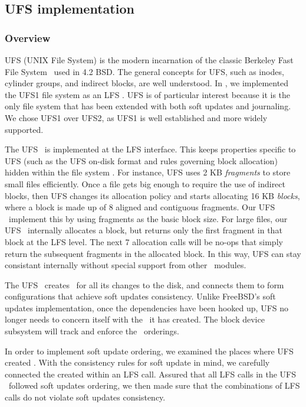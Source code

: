 \subsection{UFS implementation}
\label{sec:modules:ufs}

\subsubsection {Overview}
UFS (UNIX File System) is the modern incarnation of the classic Berkeley Fast
File System~\cite{mckusick84fast} used in 4.2 BSD. The general concepts for
UFS, such as inodes, cylinder groups, and indirect blocks, are well understood.
In \Kudos, we implemented the UFS1 file system as an LFS \module. UFS is of
particular interest because it is the only file system that has been extended
with both soft updates and journaling. ~\cite{seltzer00journaling} We chose
UFS1 over UFS2, as UFS1 is well established and more widely supported.

The UFS \module\ is implemented at the LFS interface. This keeps properties
specific to UFS (such as the UFS on-disk format and rules governing block
allocation) hidden within the file system \module. For instance, UFS uses
2 KB \emph{fragments} to store small files efficiently. Once a file gets big
enough to require the use of indirect blocks, then UFS changes its allocation
policy and starts allocating 16 KB \emph{blocks}, where a block is made up of 8
aligned and contiguous fragments. Our UFS \module\ implement this by using
fragments as the basic block size. For large files, our UFS \module\ internally
allocates a block, but returns only the first fragment in that block at the LFS
level. The next 7 allocation calls will be no-ops that simply return the
subsequent fragments in the allocated block. In this way, UFS can stay
consistant internally without special support from other \Kudos\ modules.

The UFS \module\ creates \chdescs\ for all its changes to the disk, and
connects them to form configurations that achieve soft updates consistency.
Unlike FreeBSD's soft updates implementation, once the dependencies have been
hooked up, UFS no longer needs to concern itself with the \chdescs\ it has
created. The block device subsystem will track and enforce the
\chdesc\ orderings.

In order to implement soft update ordering, we examined the places where UFS
created \chdescs. With the consistency rules for soft update in mind, we
carefully connected the \chdescs created within an LFS call. Assured that
all LFS calls in the UFS \module\ followed soft updates ordering, we then made
sure that the combinations of LFS calls do not violate soft updates
consistency.

